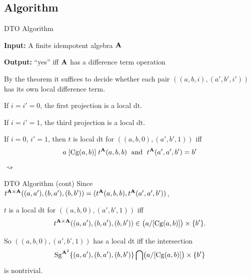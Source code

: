 \documentclass[notes=hide,12pt,xcolor=dvipsnames%
   ]{beamer}
\theoremstyle{definition}
\begin{document}

\subsection{Algorithm}
\label{sec:algor-1}

\begin{frame}[label=algorithm]{DTO Algorithm}

  {\bf Input:} A finite idempotent algebra $\mathbf{A}$

  {\bf Output:} ``yes'' iff $\mathbf{A}$ has a difference term operation

  \pause
  By the theorem it suffices to decide whether each pair
  $((a,b,i), (a',b',i'))$ %
  has its own local difference term.

  \pause
  If $i = i' = 0$, the first projection is a local dt.

  If $i = i' = 1$, the third projection is a local dt.

  If $i = 0$, $i'=1$,  then %
  $t$ is local dt for $((a,b,0), (a',b',1))$ iff
  \[
  a\mathrel{[\operatorname{Cg}(a,b)]} t^{\mathbf{A}}(a,b,b) \; \text{ and } \;
  t^{\mathbf{A}}(a',a',b') = b'
  \]
  \hfill {\Large $\rightsquigarrow$}
\end{frame}
\begin{frame}[label=algorithm]{DTO Algorithm (cont)}
  Since
    $t^{\mathbf{A}\times \mathbf{A}}((a,a'), (b,a'), (b,b')) =
    (t^{\mathbf{A}}(a,b,b),t^{\mathbf{A}}(a',a',b'))$,

  $t$ is a local dt for $((a,b,0), (a',b',1))$ iff
  \[
  t^{\mathbf{A}\times \mathbf{A}}((a,a'), (b,a'), (b,b'))\in \bigl(a/[\operatorname{Cg}(a,b)]\bigr) \times \{b'\}.
  \]


  So $((a,b,0), (a',b',1))$ has a local dt iff the intersection
  \[\operatorname{Sg}^{\mathbf{A}^2}\{(a,a'), (b,a'), (b,b')\} \bigcap
  \bigl(a/[\operatorname{Cg}(a,b)]\bigr) \times \{b'\}\]
  is nontrivial.
\end{frame}
\end{document}
